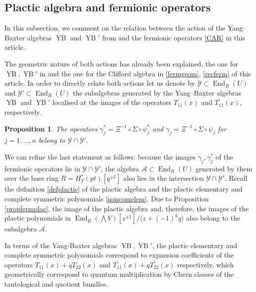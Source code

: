 \documentclass[12pt]{amsart}
\newcommand{\End}{\operatorname{End}}
\newcommand{\mc}[1]{\mathcal{#1}}
\newcommand{\ring}{R}
\newtheorem{prop}{Proposition}[section]
\numberwithin{equation}{section}
\numberwithin{figure}{section}
\newcommand{\YB}{\operatorname{YB}}
\begin{document}
\subsection{Plactic algebra and fermionic operators}
In this subsection, we comment on the relation between the action of the  Yang--Baxter algebras $\YB$ and $\YB'$ from \cite{GKS20} and the fermionic operators \eqref{CAR} in this article. 

The geometric nature of both actions has already been explained, the one for $\YB,\YB'$ in \cite[Theorem 7.3]{GKS20} and the one for the Clifford algebra in \eqref{fermgeom}, \eqref{recferm} of this article. In order to directly relate both actions let us denote by $\mathcal{Y}\subset \End_{\ring}(U)$ and $\mathcal{Y}' \subset \End_{\ring}(U)$ the subalgebras generated by the Yang--Baxter algebras $\YB$ and $\YB'$ localised at the images of the operators $T_{11}(x)$ and $T_{11}^{'}(x)$, respectively. 
\begin{prop}\label{fermtheor1}
    The operators $\gamma^*_j = \Xi^{-1} \circ \Sigma \circ \psi^*_j$ and $\gamma_j = \Xi^{-1} \circ \Sigma \circ \psi_j$ for $j=1,\ldots,n$ belong to $\mathcal{Y}\cap\mathcal{Y}'$.
\end{prop}
We can refine the last statement as follows: because the images $\gamma_j,\gamma_j^*$ of the fermionic operators lie in $\mathcal{Y}\cap\mathcal{Y}'$, the algebra $\mc{A}\subset\End_\ring(U)$ generated by them over the base ring $\ring= H^*_T(pt)[q^{\pm 1}]$ also lies in the intersection $\mathcal{Y}\cap\mathcal{Y}'$. Recall the definition \eqref{defplactic} of the plactic algebra and the plactic elementary and complete symmetric polynomials \eqref{noncomelem}. Due to Proposition \ref{propfermplac}, the image of the plactic algebra and, therefore, the images of the plactic polynomials in $\End_\ring(\bigwedge V)[z^{\pm 1}]/\langle z+ (-1)^k q \rangle$ also belong to the subalgebra $\mc{A}$. 

In terms of the Yang-Baxter algebras $\YB,\YB'$, the plactic elementary and complete symmetric polynomials correspond to expansion coefficients of the operators $T_{11}(x)+q T_{22}(x)$ and $T_{11}^{'}(x) + q T_{22}^{'}(x)$ respectively, which geometrically correspond to quantum multiplication by Chern classes of the tautological and quotient bundles. 
\end{document}
